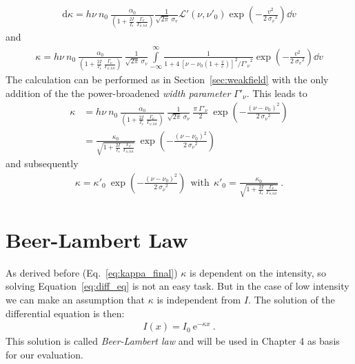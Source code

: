 \begin{align}
    \mathrm{d}\kappa = 
    h\nu~n_0~\frac{\alpha_0}{(1 + \frac{2I}{I_s}~\frac{\Gamma_\nu}{\Gamma_{\nu,tot}})} 
    \frac{1}{\sqrt{2\pi}~\sigma_v} \mathcal{L}'(\nu,\nu'_0) 
    \exp{ \left( -\frac{v^2}{2~{\sigma_v}^2} \right ) } \dd v
\end{align}
and
\begin{align}
    \kappa = h\nu~n_0~\frac{\alpha_0}{(1 + \frac{2I}{I_s}~\frac{\Gamma_\nu}{\Gamma_{\nu,tot}})}~ 
    \frac{1}{\sqrt{2\pi}~\sigma_v} 
    \int\limits_{-\infty}^{\infty} 
    \frac{1}{ 1+4~{\left [\nu-\nu_0\left ( 1 + \frac{v}{c} \right) \right] }^2 / {\Gamma'_\nu}^2 } 
    \exp{ \left (-\frac{v^2}{ 2~{\sigma_v}^2 }\right ) } \dd v
\end{align}
The calculation can be performed as in Section~\ref{sec:weakfield} with the only 
addition of the the power-broadened \textit{width parameter} \(\Gamma'_\nu \). 
This leads to
\begin{align}
    \kappa &= h\nu~n_0~
    \frac{\alpha_0}{(1 + \frac{2I}{I_s}~\frac{\Gamma_\nu}{\Gamma_{\nu,tot}})}~ 
    \frac{1}{\sqrt{2\pi}~\sigma_\nu}~\frac{\pi~\Gamma'_\nu}{2}~
    \exp{ \left ( -\frac{{(\nu - \nu_0)}^2 }{2~{\sigma_\nu}^2 } \right )} \nonumber \\
    &= \frac{\kappa_0}{\sqrt{1 + \frac{2I}{I_s}~\frac{\Gamma_\nu}{\Gamma_{\nu,tot}}}}~
    \exp{ \left ( -\frac{{(\nu - \nu_0)}^2 }{2~{\sigma_\nu}^2 } \right )}
\end{align}
and subsequently
\begin{align}
    \kappa = \kappa'_0~\exp{ \left ( -\frac{{(\nu - \nu_0)}^2 }{2~{\sigma_\nu}^2 } \right )}
    ~~\text{with}~~ \kappa'_0 = 
    \frac{\kappa_0}{\sqrt{1 + \frac{2I}{I_s}~\frac{\Gamma_\nu}{\Gamma_{\nu,tot}}}}~.
    \label{eq:kappa_final}
\end{align}


\section{Beer-Lambert Law}  %
As derived before (Eq.~\ref{eq:kappa_final}) \(\kappa \) is dependent on the 
intensity, so solving Equation~\ref{eq:diff_eq} is not an easy task. But in the 
case of low intensity we can make an assumption that \(\kappa \) is independent
from \(I\). The solution of the differential equation is then:
\begin{align}\label{eq:beer_lambert}
   I(x)=I_0~\mathrm{e}^{-\kappa x}~.
\end{align}
This solution is called \textit{Beer-Lambert law} and will be used in Chapter 4 
as basis for our evaluation.
\pagebreak


